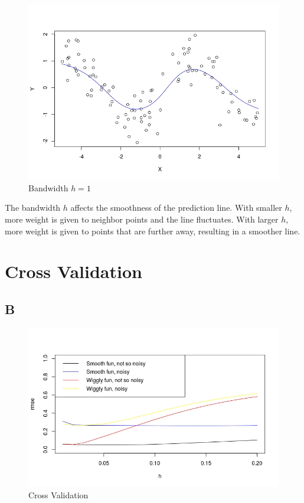 \documentclass{article}
\begin{document}
\begin{figure}[h!]
\includegraphics[width = \textwidth]{h1.jpeg}
\caption{Bandwidth \(h = 1\)}
\end{figure}

The bandwidth \(h\) affects the smoothness of the prediction line. With smaller \(h\), more weight is given to neighbor points and the line fluctuates. With larger \(h\), more weight is given to points that are further away, resulting in a smoother line.

\section*{Cross Validation}
\subsection*{B}

\begin{figure}[h!]
\includegraphics[width = \textwidth]{cv.jpeg}
\caption{Cross Validation}
\end{figure}
\end{document}
